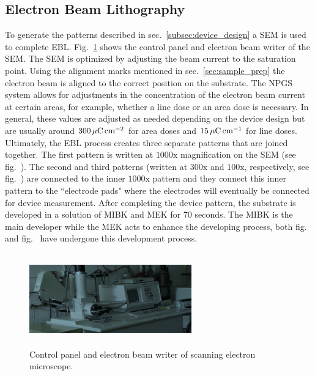\subsection{Electron Beam Lithography}\label{subsec:lithography}
To generate the patterns described in sec.~\ref{subsec:device_design} a \acs{SEM} is used to complete \acs{EBL}. Fig.~\ref{fig:SEM_machine} shows the control panel and electron beam writer of the \acs{SEM}. The \acs{SEM} is optimized by adjusting the beam current to the saturation point. Using the alignment marks mentioned in sec.~\ref{sec:sample_prep} the electron beam is aligned to the correct position on the substrate. The \acs{NPGS} system allows for adjustments in the concentration of the electron beam current at certain areas, for example, whether a line dose or an area dose is necessary. In general, these values are adjusted as needed depending on the device design but are usually around $300\,\mathrm{\mu C}\,\mathrm{cm}^{-2}$ for area doses and $15\,\mathrm{\mu C}\,\mathrm{cm}^{-1}$ for line doses. Ultimately, the \acs{EBL} process creates three separate patterns that are joined together. The first pattern is written at $1000\mathrm{x}$ magnification on the \acs{SEM} (see fig.~). The second and third patterns (written at $300\mathrm{x}$ and $100\mathrm{x}$, respectively, see fig.~) are connected to the inner $1000\mathrm{x}$ pattern and they connect this inner pattern to the ``electrode pads" where the electrodes will eventually be connected for device measurement. After completing the device pattern, the substrate is developed in a solution of \ac{MIBK} and \ac{MEK} for 70 seconds. The \acs{MIBK} is the main developer while the \acs{MEK} acts to enhance the developing process, both fig.~ and fig.~ have undergone this development process.
\begin{figure}[ht]
	\centering
	\includegraphics[height=4cm,width=7cm]{figs/experimental/SEM}
	\caption[Scanning electron microscope]{Control panel and electron beam writer of scanning electron microscope.}
	\label{fig:SEM_machine}
\end{figure}

